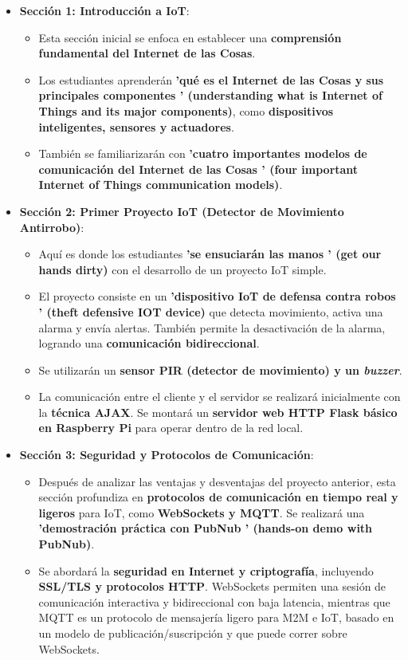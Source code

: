 \documentclass{report}
\begin{document}
\begin{itemize}
    \item \textbf{Sección 1: Introducción a IoT}:
    \begin{itemize}
        \item Esta sección inicial se enfoca en establecer una \textbf{comprensión fundamental del Internet de las Cosas}.
        \item Los estudiantes aprenderán \textbf{ 'qué es el Internet de las Cosas y sus principales componentes ' (understanding what is Internet of 
        Things and its major components)}, como \textbf{dispositivos inteligentes, sensores y actuadores}.
        \item También se familiarizarán con \textbf{ 'cuatro importantes modelos de comunicación del Internet de las Cosas ' (four important Internet 
        of Things communication models)}.
    \end{itemize}

    \item \textbf{Sección 2: Primer Proyecto IoT (Detector de Movimiento Antirrobo)}:
    \begin{itemize}
        \item Aquí es donde los estudiantes \textbf{ 'se ensuciarán las manos ' (get our hands dirty)} con el desarrollo de un proyecto IoT simple.
        \item El proyecto consiste en un \textbf{ 'dispositivo IoT de defensa contra robos ' (theft defensive IOT device)} que detecta movimiento, 
        activa una alarma y envía alertas. También permite la desactivación de la alarma, logrando una \textbf{comunicación bidireccional}.
        \item Se utilizarán un \textbf{sensor PIR (detector de movimiento) y un \textit{buzzer}}.
        \item La comunicación entre el cliente y el servidor se realizará inicialmente con la \textbf{técnica AJAX}. Se montará un \textbf{servidor web 
        HTTP Flask básico en Raspberry Pi} para operar dentro de la red local.
    \end{itemize}

    \item \textbf{Sección 3: Seguridad y Protocolos de Comunicación}:
    \begin{itemize}
        \item Después de analizar las ventajas y desventajas del proyecto anterior, esta sección profundiza en \textbf{protocolos de comunicación en 
        tiempo real y ligeros} para IoT, como \textbf{WebSockets y MQTT}. Se realizará una \textbf{ 'demostración práctica con PubNub ' (hands-on demo 
        with PubNub)}.
        \item Se abordará la \textbf{seguridad en Internet y criptografía}, incluyendo \textbf{SSL/TLS y protocolos HTTP}. WebSockets permiten una 
        sesión de comunicación interactiva y bidireccional con baja latencia, mientras que MQTT es un protocolo de mensajería ligero para M2M e IoT, 
        basado en un modelo de publicación/suscripción y que puede correr sobre WebSockets.
    \end{itemize}


\end{itemize}
\end{document}
